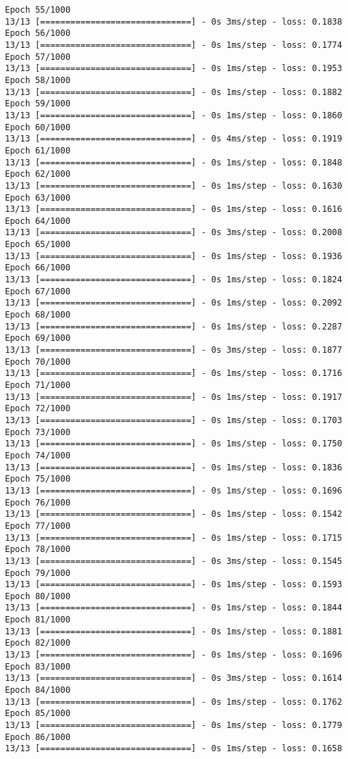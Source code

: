 \documentclass[11pt]{article}
\begin{document}
\begin{Verbatim}[commandchars=\\\{\}]
Epoch 55/1000
13/13 [==============================] - 0s 3ms/step - loss: 0.1838
Epoch 56/1000
13/13 [==============================] - 0s 1ms/step - loss: 0.1774
Epoch 57/1000
13/13 [==============================] - 0s 1ms/step - loss: 0.1953
Epoch 58/1000
13/13 [==============================] - 0s 1ms/step - loss: 0.1882
Epoch 59/1000
13/13 [==============================] - 0s 1ms/step - loss: 0.1860
Epoch 60/1000
13/13 [==============================] - 0s 4ms/step - loss: 0.1919
Epoch 61/1000
13/13 [==============================] - 0s 1ms/step - loss: 0.1848
Epoch 62/1000
13/13 [==============================] - 0s 1ms/step - loss: 0.1630
Epoch 63/1000
13/13 [==============================] - 0s 1ms/step - loss: 0.1616
Epoch 64/1000
13/13 [==============================] - 0s 3ms/step - loss: 0.2008
Epoch 65/1000
13/13 [==============================] - 0s 1ms/step - loss: 0.1936
Epoch 66/1000
13/13 [==============================] - 0s 1ms/step - loss: 0.1824
Epoch 67/1000
13/13 [==============================] - 0s 1ms/step - loss: 0.2092
Epoch 68/1000
13/13 [==============================] - 0s 1ms/step - loss: 0.2287
Epoch 69/1000
13/13 [==============================] - 0s 3ms/step - loss: 0.1877
Epoch 70/1000
13/13 [==============================] - 0s 1ms/step - loss: 0.1716
Epoch 71/1000
13/13 [==============================] - 0s 1ms/step - loss: 0.1917
Epoch 72/1000
13/13 [==============================] - 0s 1ms/step - loss: 0.1703
Epoch 73/1000
13/13 [==============================] - 0s 1ms/step - loss: 0.1750
Epoch 74/1000
13/13 [==============================] - 0s 1ms/step - loss: 0.1836
Epoch 75/1000
13/13 [==============================] - 0s 1ms/step - loss: 0.1696
Epoch 76/1000
13/13 [==============================] - 0s 1ms/step - loss: 0.1542
Epoch 77/1000
13/13 [==============================] - 0s 1ms/step - loss: 0.1715
Epoch 78/1000
13/13 [==============================] - 0s 3ms/step - loss: 0.1545
Epoch 79/1000
13/13 [==============================] - 0s 1ms/step - loss: 0.1593
Epoch 80/1000
13/13 [==============================] - 0s 1ms/step - loss: 0.1844
Epoch 81/1000
13/13 [==============================] - 0s 1ms/step - loss: 0.1881
Epoch 82/1000
13/13 [==============================] - 0s 1ms/step - loss: 0.1696
Epoch 83/1000
13/13 [==============================] - 0s 3ms/step - loss: 0.1614
Epoch 84/1000
13/13 [==============================] - 0s 1ms/step - loss: 0.1762
Epoch 85/1000
13/13 [==============================] - 0s 1ms/step - loss: 0.1779
Epoch 86/1000
13/13 [==============================] - 0s 1ms/step - loss: 0.1658

\end{Verbatim}
\end{document}
